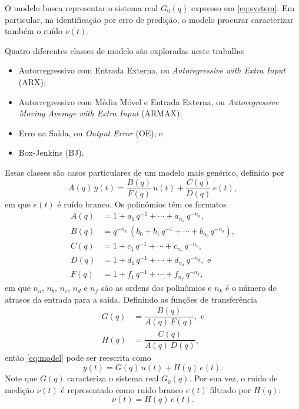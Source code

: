 \documentclass{ppgeesa}
\renewcommand{\Prod}{\,}
\begin{document}
O modelo busca representar o sistema real $G_0(q)$ expresso em \eqref{eq:system}.
Em particular, na identificação por erro de predição, o modelo procurar caracterizar também o ruído $\nu(t)$.

Quatro diferentes classes de modelo são exploradas neste trabalho:
\begin{itemize}
  \item Autorregressivo com Entrada Externa, ou \textit{Autoregressive with Extra Input} (ARX);
  \item Autorregressivo com Média Móvel e Entrada Externa, ou \textit{Autoregressive Moving Average with Extra Input} (ARMAX);
  \item Erro na Saída, ou \textit{Output Error} (OE); e
  \item Box-Jenkins (BJ).
\end{itemize}
Essas classes são casos particulares de um modelo mais genérico, definido por
\begin{equation}\label{eq:model}
  A(q) \Prod y(t) = \dfrac{B(q)}{F(q)} \Prod u(t) + \dfrac{C(q)}{D(q)} \Prod e(t)
  ,
\end{equation}
em que $e(t)$ é ruído branco.
Os polinômios têm os formatos
\begin{align}
  A(q) &= 1 + a_1 \Prod q^{-1} + \dotsb + a_{n_a} \Prod q^{-n_a}
  ,
  \\
  B(q) &= q^{-n_k} \Prod \left(b_0 + b_1 \Prod q^{-1} + \dotsb + b_{n_b} \Prod q^{-n_b}\right)
  ,
  \\
  C(q) &= 1 + c_1 \Prod q^{-1} + \dotsb + c_{n_c} \Prod q^{-n_c}
  ,
  \\
  D(q) &= 1 + d_1 \Prod q^{-1} + \dotsb + d_{n_d} \Prod q^{-n_d}
  , \text{ e}
  \\
  F(q) &= 1 + f_1 \Prod q^{-1} + \dotsb + f_{n_f} \Prod q^{-n_f}
  ,
\end{align}
em que $n_a$, $n_b$, $n_c$, $n_d$ e $n_f$ são as ordens dos polinômios e $n_k$ é o número de atrasos da entrada para a saída.
Definindo as funções de transferência
\begin{align}
  G(q) &= \dfrac{B(q)}{A(q) \Prod F(q)}
  , \text{ e}
  \\
  H(q) &= \dfrac{C(q)}{A(q) \Prod D(q)}
  ,
\end{align}
então \eqref{eq:model} pode ser reescrita como
\begin{equation}\label{eq:model-tf}
  y(t) = G(q) \Prod u(t) + H(q) \Prod e(t)
  .
\end{equation}
Note que $G(q)$ caracteriza o sistema real $G_0(q)$.
Por sua vez, o ruído de medição $\nu(t)$ é representado como ruído branco $e(t)$ filtrado por $H(q)$: %
\begin{equation}
  \nu(t) = H(q) \Prod e(t)
  .
\end{equation}
\end{document}
